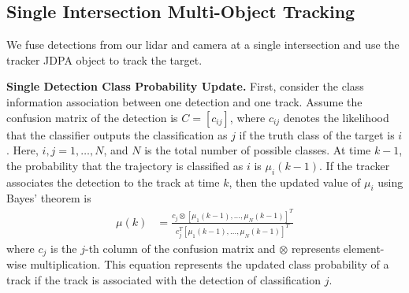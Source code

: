 \documentclass[lettersize,journal]{IEEEtran}
\begin{document}
\subsection{Single Intersection Multi-Object Tracking}

We fuse detections from our lidar and camera at a single intersection and use the tracker JDPA object to track the target.

\textbf{Single Detection Class Probability Update.}
First, consider the class information association between one detection and one track. 
Assume the confusion matrix of the detection is \(C=\left[c_{i j}\right]\), where \(c_{i j}\) denotes the likelihood that the classifier outputs the classification as \(j\) if the truth class of the target is \(i\).
Here, \(i,j = 1,…, N\), and \(N\) is the total number of possible classes.
At time \(k-1\), the probability that the trajectory is classified as \(i\) is \(\mu_{i}(k-1)\).
If the tracker associates the detection to the track at time \(k\), then the updated value of \(\mu_{i}\) using Bayes' theorem is
\begin{align}
	\mu(k) & = \frac{c_{j} \otimes [ \mu_1(k-1), \ldots, \mu_N(k-1) ]^T}{c_{j}^{T} [ \mu_1(k-1), \ldots, \mu_N(k-1) ]^T}
\end{align}
where \(c_{j}\) is the \(j\)-th column of the confusion matrix and \(\otimes\) represents element-wise multiplication. 
This equation represents the updated class probability of a track if the track is associated with the detection of classification \(j\).
\end{document}
